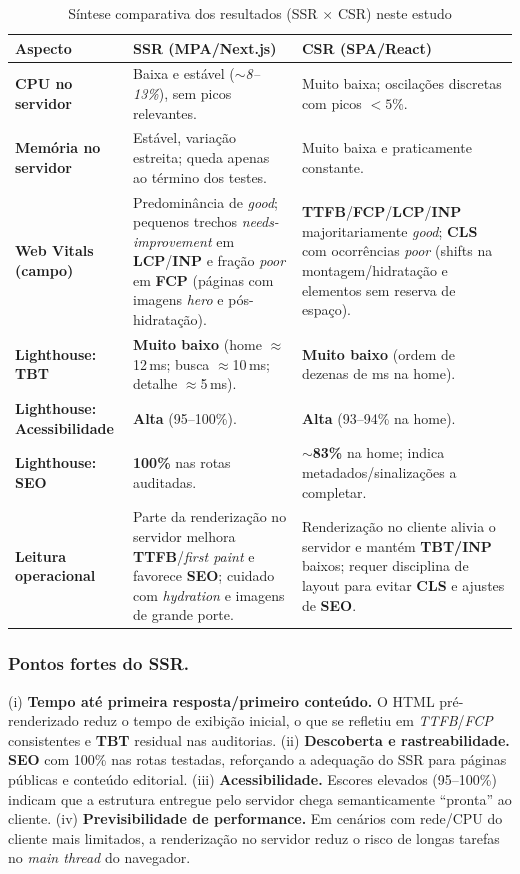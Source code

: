 \begin{table}[H]
\centering
\caption{Síntese comparativa dos resultados (SSR $\times$ CSR) neste estudo}
\label{tab:comparativo-ssr-csr}
\begin{tabular}{|p{4.2cm}|p{5.2cm}|p{5.2cm}|}
\hline
\textbf{Aspecto} & \textbf{SSR (MPA/Next.js)} & \textbf{CSR (SPA/React)} \\
\hline
\textbf{CPU no servidor} & Baixa e estável (\textit{$\sim$8--13\%}), sem picos relevantes. & Muito baixa; oscilações discretas com picos $<5\%$. \\
\hline
\textbf{Memória no servidor} & Estável, variação estreita; queda apenas ao término dos testes. & Muito baixa e praticamente constante. \\
\hline
\textbf{Web Vitals (campo)} & Predominância de \textit{good}; pequenos trechos \textit{needs-improvement} em \textbf{LCP}/\textbf{INP} e fração \textit{poor} em \textbf{FCP} (páginas com imagens \emph{hero} e pós-hidratação). & \textbf{TTFB}/\textbf{FCP}/\textbf{LCP}/\textbf{INP} majoritariamente \textit{good}; \textbf{CLS} com ocorrências \textit{poor} (shifts na montagem/hidratação e elementos sem reserva de espaço). \\
\hline
\textbf{Lighthouse: TBT} & \textbf{Muito baixo} (home $\approx$12\,ms; busca $\approx$10\,ms; detalhe $\approx$5\,ms). & \textbf{Muito baixo} (ordem de dezenas de ms na home). \\
\hline
\textbf{Lighthouse: Acessibilidade} & \textbf{Alta} (95--100\%). & \textbf{Alta} (93--94\% na home). \\
\hline
\textbf{Lighthouse: SEO} & \textbf{100\%} nas rotas auditadas. & \textbf{$\sim$83\%} na home; indica metadados/sinalizações a completar. \\
\hline
\textbf{Leitura operacional} & Parte da renderização no servidor melhora \textbf{TTFB}/\emph{first paint} e favorece \textbf{SEO}; cuidado com \emph{hydration} e imagens de grande porte. & Renderização no cliente alivia o servidor e mantém \textbf{TBT/INP} baixos; requer disciplina de layout para evitar \textbf{CLS} e ajustes de \textbf{SEO}. \\
\hline
\end{tabular}
\end{table}

\subsubsection{Pontos fortes do SSR.}
(i) \textbf{Tempo até primeira resposta/primeiro conteúdo.} O HTML pré-renderizado reduz o tempo de exibição inicial, o que se refletiu em \textit{TTFB}/\textit{FCP} consistentes e \textbf{TBT} residual nas auditorias.  
(ii) \textbf{Descoberta e rastreabilidade.} \textbf{SEO} com 100\% nas rotas testadas, reforçando a adequação do SSR para páginas públicas e conteúdo editorial.  
(iii) \textbf{Acessibilidade.} Escores elevados (95--100\%) indicam que a estrutura entregue pelo servidor chega semanticamente “pronta” ao cliente.  
(iv) \textbf{Previsibilidade de performance.} Em cenários com rede/CPU do cliente mais limitados, a renderização no servidor reduz o risco de longas tarefas no \emph{main thread} do navegador.


